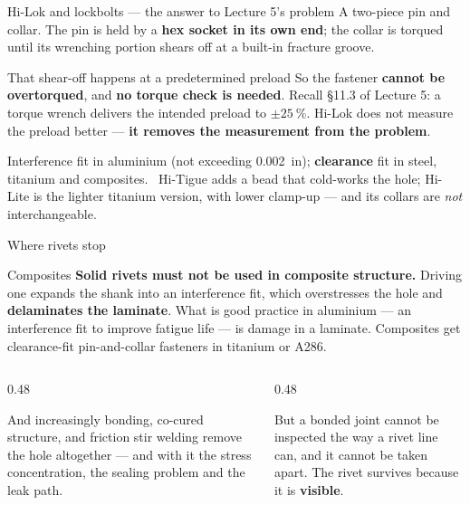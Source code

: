 \documentclass[aspectratio=169,10pt]{beamer}
\begin{document}
\begin{frame}{Hi-Lok and lockbolts --- the answer to Lecture 5's problem}
A two-piece pin and collar. The pin is held by a \textbf{hex socket in its own end}; the collar is
torqued until its wrenching portion \alert{shears off at a built-in fracture groove}.
\vfill
\begin{alertblock}{That shear-off happens at a predetermined preload}
So the fastener \textbf{cannot be overtorqued}, and \textbf{no torque check is needed}.
\vspace{3pt}
Recall \S11.3 of Lecture 5: a torque wrench delivers the intended preload to $\pm\SI{25}{\percent}$.
Hi-Lok does not measure the preload better --- \textbf{it removes the measurement from the problem}.
\end{alertblock}
\vfill
\footnotesize
Interference fit in aluminium (not exceeding \SI{0.002}{in}); \textbf{clearance} fit in steel,
titanium and composites. \ Hi-Tigue adds a bead that cold-works the hole; Hi-Lite is the lighter
titanium version, with lower clamp-up --- and its collars are \emph{not} interchangeable.
\end{frame}

\begin{frame}{Where rivets stop}
\begin{alertblock}{Composites}
\textbf{Solid rivets must not be used in composite structure.} Driving one expands the shank into an
interference fit, which overstresses the hole and \textbf{delaminates the laminate}.
\vspace{3pt}
What is good practice in aluminium --- an interference fit to improve fatigue life --- is damage in a
laminate. Composites get clearance-fit pin-and-collar fasteners in titanium or A286.
\end{alertblock}
\vfill
\begin{columns}[T]
\begin{column}{0.48\textwidth}
\begin{block}{And increasingly}
bonding, co-cured structure, and friction stir welding remove the hole altogether --- and with it the
stress concentration, the sealing problem and the leak path.
\end{block}
\end{column}
\begin{column}{0.48\textwidth}
\begin{block}{But}
a bonded joint cannot be inspected the way a rivet line can, and it cannot be taken apart. The rivet
survives because it is \textbf{visible}.
\end{block}
\end{column}
\end{columns}
\end{frame}
\end{document}
